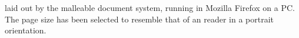 \begin{center}
\vspace{0.2in}
\hspace{0.05\textwidth}
\end{center}


\clearpage


\cite{Pinkney2011} laid out by the malleable document system, running in Mozilla Firefox on a PC. The page size has been selected to resemble that of an \ebook{} reader in a portrait orientation.

